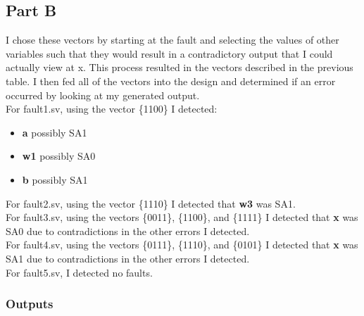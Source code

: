 \documentclass[a4paper, 12pt]{scrartcl}
\begin{document}
\newpage
\subsection{Part B}
\label{sec:orga91b696}
I chose these vectors by starting at the fault and selecting the values of other variables such that they would result in a contradictory output that I could actually view at x. This process resulted in the vectors described in the previous table. I then fed all of the vectors into the design and determined if an error occurred by looking at my generated output.\\

For fault1.sv, using the vector \{1100\} I detected:
\begin{itemize}
\item \textbf{a} possibly SA1
\item \textbf{w1} possibly SA0
\item \textbf{b} possibly SA1\\
\end{itemize}

For fault2.sv, using the vector \{1110\} I detected that \textbf{w3} was SA1.\\

For fault3.sv, using the vectors \{0011\}, \{1100\}, and \{1111\} I detected that \textbf{x} was SA0 due to contradictions in the other errors I detected.\\

For fault4.sv, using the vectors \{0111\}, \{1110\}, and \{0101\} I detected that \textbf{x} was SA1 due to contradictions in the other errors I detected.\\

For fault5.sv, I detected no faults.\\


\newpage
\subsubsection{Outputs}
\label{sec:org07a6823}
\end{document}
